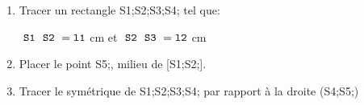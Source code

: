 \documentclass[exercice]{thedocument}%
\begin{document}
%
\begin{enumerate}
    \item Tracer un rectangle \textsf{\<S1;\<S2;\<S3;\<S4;} tel que:
    \begin{center}
        $\textsf{\<S1;\<S2;}=\<l1;$ cm et $\textsf{\<S2;\<S3;}=\<l2;$ cm
    \end{center}
    \item Placer le point \textsf{\<S5;}, milieu de \textsf{[\<S1;\<S2;]}.
    \item Tracer le symétrique de \textsf{\<S1;\<S2;\<S3;\<S4;} par rapport à la droite (\textsf{\<S4;\<S5;})
\end{enumerate}
\end{document}
